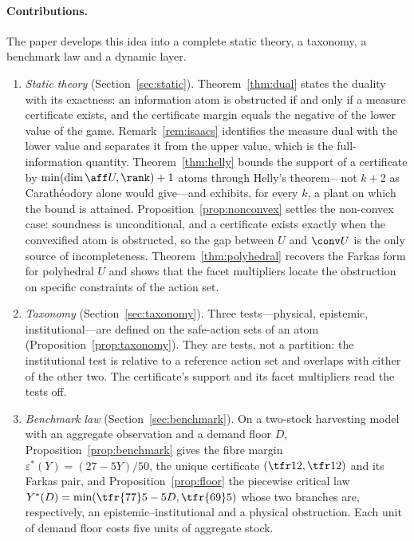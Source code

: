 \paragraph{Contributions.} The paper develops this idea into a complete static theory, a taxonomy, a benchmark law and a dynamic layer.
\begin{enumerate}[leftmargin=1.6em,itemsep=1pt]
\item \emph{Static theory} (Section~\ref{sec:static}). Theorem~\ref{thm:dual} states the duality with its exactness: an information atom is obstructed if and only if a measure certificate exists, and the certificate margin equals the negative of the lower value of the game. Remark~\ref{rem:isaacs} identifies the measure dual with the lower value and separates it from the upper value, which is the full-information quantity. Theorem~\ref{thm:helly} bounds the support of a certificate by $\min(\dim\aff U,\rank)+1$ atoms through Helly's theorem---not $k+2$ as Carath\'eodory alone would give---and exhibits, for every $k$, a plant on which the bound is attained. Proposition~\ref{prop:nonconvex} settles the non-convex case: soundness is unconditional, and a certificate exists exactly when the convexified atom is obstructed, so the gap between $U$ and $\conv U$ is the only source of incompleteness. Theorem~\ref{thm:polyhedral} recovers the Farkas form for polyhedral $U$ and shows that the facet multipliers locate the obstruction on specific constraints of the action set.
\item \emph{Taxonomy} (Section~\ref{sec:taxonomy}). Three tests---physical, epistemic, institutional---are defined on the safe-action sets of an atom (Proposition~\ref{prop:taxonomy}). They are tests, not a partition: the institutional test is relative to a reference action set and overlaps with either of the other two. The certificate's support and its facet multipliers read the tests off.
\item \emph{Benchmark law} (Section~\ref{sec:benchmark}). On a two-stock harvesting model with an aggregate observation and a demand floor $D$, Proposition~\ref{prop:benchmark} gives the fibre margin $\varepsilon^\ast(Y)=(27-5Y)/50$, the unique certificate $(\tfr12,\tfr12)$ and its Farkas pair, and Proposition~\ref{prop:floor} the piecewise critical law $Y^\ast(D)=\min(\tfr{77}5-5D,\tfr{69}5)$ whose two branches are, respectively, an epistemic--institutional and a physical obstruction. Each unit of demand floor costs five units of aggregate stock.

\end{enumerate}

